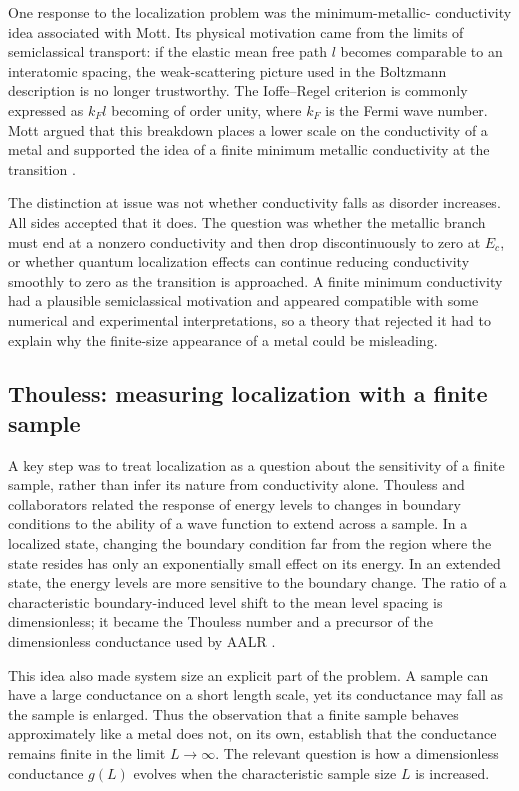 \documentclass[11pt,a4paper]{article}
\numberwithin{equation}{section}
\begin{document}
One response to the localization problem was the minimum-metallic-
conductivity idea associated with Mott. Its physical motivation came from
the limits of semiclassical transport: if the elastic mean free path $l$
becomes comparable to an interatomic spacing, the weak-scattering picture
used in the Boltzmann description is no longer trustworthy. The Ioffe--Regel
criterion is commonly expressed as $k_F l$ becoming of order unity, where
$k_F$ is the Fermi wave number. Mott argued that this breakdown places a
lower scale on the conductivity of a metal and supported the idea of a
finite minimum metallic conductivity at the transition
\cite{Mott1972MinimumConductivity,Mott1974,LeeRamakrishnan1985}.

The distinction at issue was not whether conductivity falls as disorder
increases. All sides accepted that it does. The question was whether the
metallic branch must end at a nonzero conductivity and then drop
 discontinuously to zero at $E_c$, or whether quantum localization effects
can continue reducing conductivity smoothly to zero as the transition is
approached. A finite minimum conductivity had a plausible semiclassical
motivation and appeared compatible with some numerical and experimental
interpretations, so a theory that rejected it had to explain why the
finite-size appearance of a metal could be misleading.

\subsection{Thouless: measuring localization with a finite sample}

A key step was to treat localization as a question about the sensitivity
of a finite sample, rather than infer its nature from conductivity alone.
Thouless and collaborators related the response of energy levels to
changes in boundary conditions to the ability of a wave function to extend
across a sample. In a localized state, changing the boundary condition
far from the region where the state resides has only an exponentially
small effect on its energy. In an extended state, the energy levels are
more sensitive to the boundary change. The ratio of a characteristic
boundary-induced level shift to the mean level spacing is dimensionless;
it became the Thouless number and a precursor of the dimensionless
conductance used by AALR \cite{Thouless1974,AALR1979}.

This idea also made system size an explicit part of the problem. A sample
can have a large conductance on a short length scale, yet its conductance
may fall as the sample is enlarged. Thus the observation that a finite
sample behaves approximately like a metal does not, on its own, establish
that the conductance remains finite in the limit $L\to\infty$. The relevant
question is how a dimensionless conductance $g(L)$ evolves when the
characteristic sample size $L$ is increased.
\end{document}
